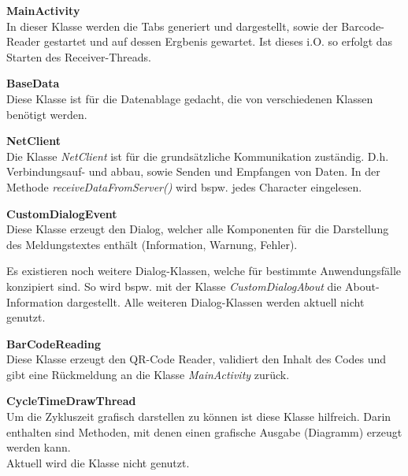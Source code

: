 \textbf{MainActivity}\\
In dieser Klasse werden die Tabs generiert und dargestellt, sowie der 
Barcode-Reader gestartet und auf dessen Ergbenis gewartet. Ist dieses i.O. so 
erfolgt das Starten des Receiver-Threads.

\textbf{BaseData}\\
Diese Klasse ist für die Datenablage gedacht, die von verschiedenen Klassen  
benötigt werden.

\textbf{NetClient}\\
Die Klasse \textit{NetClient} ist für die grundsätzliche Kommunikation 
zuständig. D.h. Verbindungsauf- und abbau, sowie Senden und Empfangen von 
Daten. In der Methode \textit{receiveDataFromServer()} wird bspw. jedes 
Character eingelesen.

\textbf{CustomDialogEvent}\\
Diese Klasse erzeugt den Dialog, welcher alle Komponenten für die Darstellung 
des Meldungstextes enthält (Information, Warnung, Fehler).

Es existieren noch weitere Dialog-Klassen, welche für bestimmte Anwendungsfälle 
konzipiert sind. So wird bspw. mit der Klasse \textit{CustomDialogAbout} die 
About-Information dargestellt. Alle weiteren Dialog-Klassen werden aktuell 
nicht genutzt.

\textbf{BarCodeReading}\\
Diese Klasse erzeugt den QR-Code Reader, validiert den Inhalt des Codes und 
gibt eine Rückmeldung an die Klasse \textit{MainActivity} zurück.

\textbf{CycleTimeDrawThread}\\
Um die Zykluszeit grafisch darstellen zu können ist diese Klasse hilfreich. 
Darin enthalten sind Methoden, mit denen einen grafische Ausgabe (Diagramm) 
erzeugt werden kann.\\
Aktuell wird die Klasse nicht genutzt.

